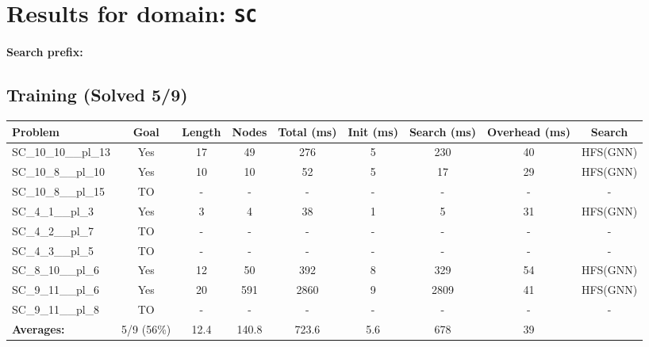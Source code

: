 \documentclass{article}
\begin{document}
\section*{Results for domain: \texttt{SC}}
\textbf{Search prefix:} 
\\[0.5cm]
\subsection*{Training (Solved 5/9)}
\begin{tabular}{lcccccccc}
\toprule
Problem & Goal & Length & Nodes & Total (ms) & Init (ms) & Search (ms) & Overhead (ms) & Search \\
\midrule
SC\_10\_10\_\_pl\_13 & Yes & 17 & 49 & 276 & 5 & 230 & 40 & HFS(GNN) \\
SC\_10\_8\_\_pl\_10 & Yes & 10 & 10 & 52 & 5 & 17 & 29 & HFS(GNN) \\
SC\_10\_8\_\_pl\_15 & TO & - & - & - & - & - & - & - \\
SC\_4\_1\_\_pl\_3 & Yes & 3 & 4 & 38 & 1 & 5 & 31 & HFS(GNN) \\
SC\_4\_2\_\_pl\_7 & TO & - & - & - & - & - & - & - \\
SC\_4\_3\_\_pl\_5 & TO & - & - & - & - & - & - & - \\
SC\_8\_10\_\_pl\_6 & Yes & 12 & 50 & 392 & 8 & 329 & 54 & HFS(GNN) \\
SC\_9\_11\_\_pl\_6 & Yes & 20 & 591 & 2860 & 9 & 2809 & 41 & HFS(GNN) \\
SC\_9\_11\_\_pl\_8 & TO & - & - & - & - & - & - & - \\
\textbf{Averages:} & 5/9 (56\%) & 12.4 & 140.8 & 723.6 & 5.6 & 678 & 39 & \\
\bottomrule
\end{tabular}
\\[0.7cm]
\end{document}
